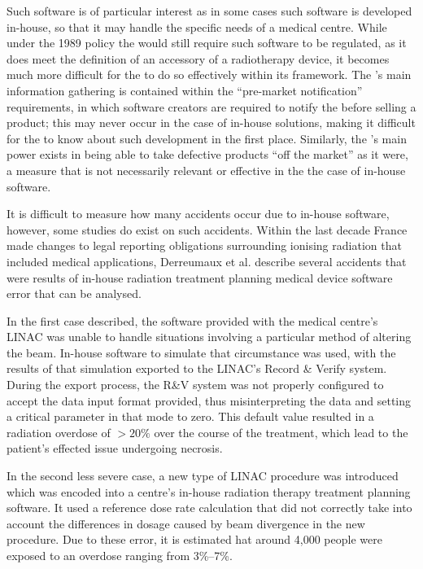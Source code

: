 \documentclass{cshonours}
\newcommand{\etal}{et al.\xspace}
\begin{document}
Such software is of particular interest as in some cases such software is developed in-house, so that it may handle the specific needs of a medical centre. While under the 1989 policy the \fda would still require such software to be regulated, as it does meet the definition of an accessory of a radiotherapy device, it becomes much more difficult for the \fda to do so effectively within its framework. The \fda's main information gathering is contained within the ``pre-market notification'' requirements, in which software creators are required to notify the \fda before selling a product; this may never occur in the case of in-house solutions, making it difficult for the \fda to know about such development in the first place. Similarly, the \fda's main power exists in being able to take defective products ``off the market'' as it were, a measure that is not necessarily relevant or effective in the the case of in-house software.

It is difficult to measure how many accidents occur due to in-house software, however, some studies do exist on such accidents. Within the last decade France made changes to legal reporting obligations surrounding ionising radiation that included medical applications, Derreumaux \etal \cite{derreumaux2008lessons} describe several accidents that were results of in-house radiation treatment planning medical device software error that can be analysed.

In the first case described, the software provided with the medical centre's LINAC was unable to handle situations involving a particular method of altering the beam. In-house software to simulate that circumstance was used, with the results of that simulation exported to the LINAC's Record \& Verify system. During the export process, the R\&V system was not properly configured to accept the data input format provided, thus misinterpreting the data and setting a critical parameter in that mode to zero. This default value resulted in a radiation overdose of $>20\%$ over the course of the treatment, which lead to the patient's effected issue undergoing necrosis.

In the second less severe case, a new type of LINAC procedure was introduced which was encoded into a centre's in-house radiation therapy treatment planning software. It used a reference dose rate calculation that did not correctly take into account the differences in dosage caused by beam divergence in the new procedure. Due to these error, it is estimated hat around 4,000 people were exposed to an overdose ranging from 3\%--7\%.
\end{document}
